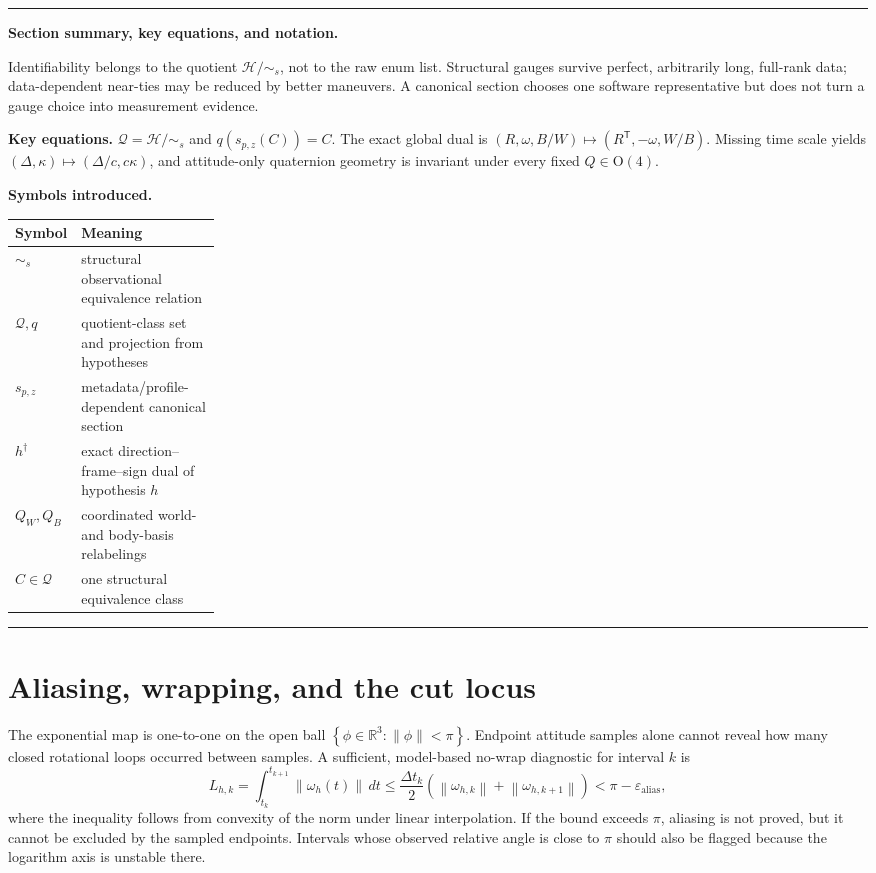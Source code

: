 \documentclass[11pt]{article}
\newcommand{\R}{\mathbb{R}}
\newcommand{\norm}[1]{\left\lVert #1 \right\rVert}
\newcommand{\set}[1]{\left\{ #1 \right\}}
\newenvironment{sectionrecap}
{\par\medskip\begingroup\small\noindent\rule{\linewidth}{0.4pt}\par
\smallskip\noindent\textbf{Section summary, key equations, and notation.}\par\smallskip}
{\par\smallskip\noindent\rule{\linewidth}{0.4pt}\par\endgroup\medskip}
\begin{document}
    \begin{sectionrecap}
        Identifiability belongs to the quotient $\mathcal H/\!\sim_s$, not to the raw enum list.
        Structural gauges survive perfect, arbitrarily long, full-rank data; data-dependent
        near-ties may be reduced by better maneuvers. A canonical section chooses one software
        representative but does not turn a gauge choice into measurement evidence.

        \noindent\textbf{Key equations.}
        \(\mathcal Q=\mathcal H/\!\sim_s\) and
        \(q(s_{p,z}(C))=C\). The exact global dual is
        \((R,\omega,B/W)\mapsto(R^{\mathsf T},-\omega,W/B)\). Missing time scale yields
        \((\Delta,\kappa)\mapsto(\Delta/c,c\kappa)\), and attitude-only quaternion geometry is
        invariant under every fixed $Q\in\mathrm O(4)$.

        \noindent\textbf{Symbols introduced.}
        \par\noindent\begin{tabularx}{\linewidth}{@{}p{0.24\linewidth}Y@{}}
\toprule
Symbol & Meaning \\
\midrule
$\sim_s$ & structural observational equivalence relation \\
$\mathcal Q,q$ & quotient-class set and projection from hypotheses \\
$s_{p,z}$ & metadata/profile-dependent canonical section \\
$h^\dagger$ & exact direction--frame--sign dual of hypothesis $h$ \\
$Q_W,Q_B$ & coordinated world- and body-basis relabelings \\
$C\in\mathcal Q$ & one structural equivalence class \\
\bottomrule
        \end{tabularx}
    \end{sectionrecap}


    \section{Aliasing, wrapping, and the cut locus}\label{app:aliasing}

    The exponential map is one-to-one on the open ball
    $\set{\phi\in\R^3:\norm{\phi}<\pi}$. Endpoint attitude samples alone cannot reveal
    how many closed rotational loops occurred between samples. A sufficient, model-based
    no-wrap diagnostic for interval $k$ is
    \begin{equation}
        L_{h,k}
        =\int_{t_k}^{t_{k+1}}\norm{\omega_h(t)}\,dt
        \le
        \frac{\Delta t_k}{2}
        \left(\norm{\omega_{h,k}}+\norm{\omega_{h,k+1}}\right)
        <\pi-\varepsilon_{\mathrm{alias}},
    \end{equation}
    where the inequality follows from convexity of the norm under linear interpolation.
    If the bound exceeds $\pi$, aliasing is not proved, but it cannot be excluded by the
    sampled endpoints. Intervals whose observed relative angle is close to $\pi$ should also
    be flagged because the logarithm axis is unstable there.
\end{document}
